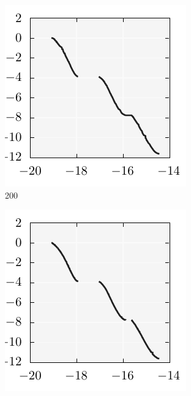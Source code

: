 \documentclass{stdlocal}
\begin{document}
\begin{figure}[t]
\begin{subfigure}[b]{0.24\textwidth}
        \includegraphics[width=\textwidth]{../../plots/kursawe_200_tessellation.pdf}
        \caption{200}
      \end{subfigure}
      \begin{subfigure}[b]{0.24\textwidth}
        \center
        \includegraphics[width=\textwidth]{../../plots/kursawe_400_tessellation.pdf}

\end{subfigure}
\end{figure}
\end{document}
